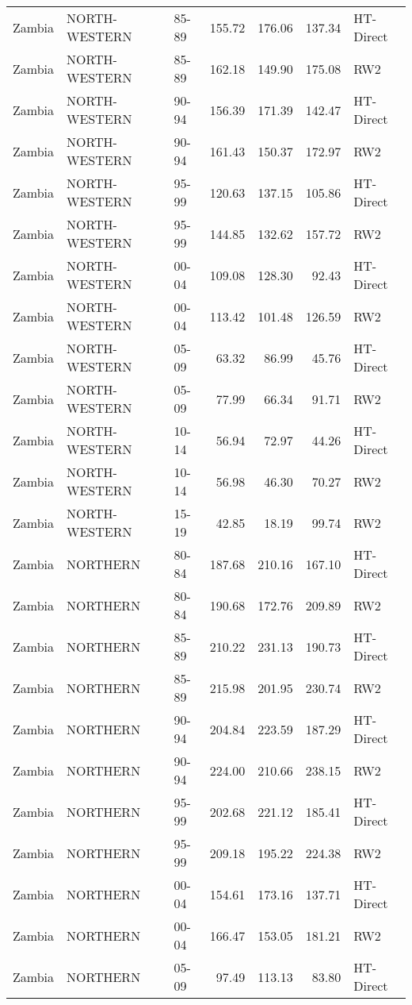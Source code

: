 \begin{longtable}{lllrrrl}
  Zambia & NORTH-WESTERN & 85-89 & 155.72 & 176.06 & 137.34 & HT-Direct \\ 
  Zambia & NORTH-WESTERN & 85-89 & 162.18 & 149.90 & 175.08 & RW2 \\ 
  Zambia & NORTH-WESTERN & 90-94 & 156.39 & 171.39 & 142.47 & HT-Direct \\ 
  Zambia & NORTH-WESTERN & 90-94 & 161.43 & 150.37 & 172.97 & RW2 \\ 
  Zambia & NORTH-WESTERN & 95-99 & 120.63 & 137.15 & 105.86 & HT-Direct \\ 
  Zambia & NORTH-WESTERN & 95-99 & 144.85 & 132.62 & 157.72 & RW2 \\ 
  Zambia & NORTH-WESTERN & 00-04 & 109.08 & 128.30 & 92.43 & HT-Direct \\ 
  Zambia & NORTH-WESTERN & 00-04 & 113.42 & 101.48 & 126.59 & RW2 \\ 
  Zambia & NORTH-WESTERN & 05-09 & 63.32 & 86.99 & 45.76 & HT-Direct \\ 
  Zambia & NORTH-WESTERN & 05-09 & 77.99 & 66.34 & 91.71 & RW2 \\ 
  Zambia & NORTH-WESTERN & 10-14 & 56.94 & 72.97 & 44.26 & HT-Direct \\ 
  Zambia & NORTH-WESTERN & 10-14 & 56.98 & 46.30 & 70.27 & RW2 \\ 
  Zambia & NORTH-WESTERN & 15-19 & 42.85 & 18.19 & 99.74 & RW2 \\ 
  Zambia & NORTHERN & 80-84 & 187.68 & 210.16 & 167.10 & HT-Direct \\ 
  Zambia & NORTHERN & 80-84 & 190.68 & 172.76 & 209.89 & RW2 \\ 
  Zambia & NORTHERN & 85-89 & 210.22 & 231.13 & 190.73 & HT-Direct \\ 
  Zambia & NORTHERN & 85-89 & 215.98 & 201.95 & 230.74 & RW2 \\ 
  Zambia & NORTHERN & 90-94 & 204.84 & 223.59 & 187.29 & HT-Direct \\ 
  Zambia & NORTHERN & 90-94 & 224.00 & 210.66 & 238.15 & RW2 \\ 
  Zambia & NORTHERN & 95-99 & 202.68 & 221.12 & 185.41 & HT-Direct \\ 
  Zambia & NORTHERN & 95-99 & 209.18 & 195.22 & 224.38 & RW2 \\ 
  Zambia & NORTHERN & 00-04 & 154.61 & 173.16 & 137.71 & HT-Direct \\ 
  Zambia & NORTHERN & 00-04 & 166.47 & 153.05 & 181.21 & RW2 \\ 
  Zambia & NORTHERN & 05-09 & 97.49 & 113.13 & 83.80 & HT-Direct \\ 

\end{longtable}
